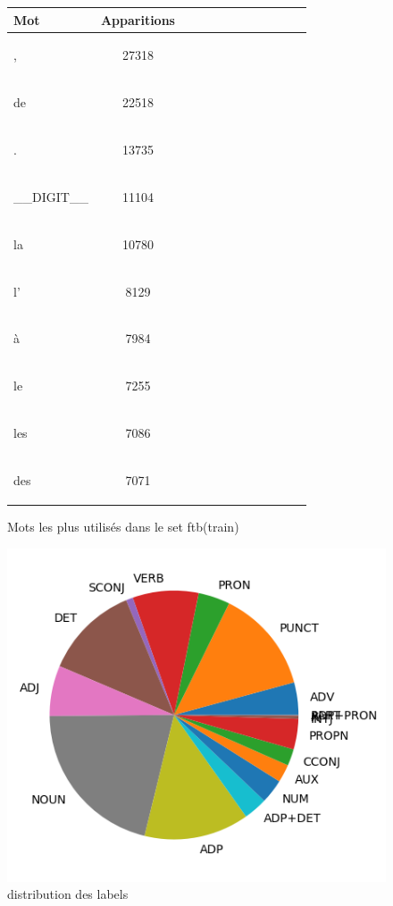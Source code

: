 \begin{figure}[H] \begin{minipage}{0.48\textwidth} \centering \begin{tabular}{|l || *{11 }{|c} |} \hline
Mot & Apparitions  \\ \hline
\begin{verb} , \end{verb} &27318\\ \hline
\begin{verb} de \end{verb} &22518\\ \hline
\begin{verb} . \end{verb} &13735\\ \hline
\begin{verb} __DIGIT__ \end{verb} &11104\\ \hline
\begin{verb} la \end{verb} &10780\\ \hline
\begin{verb} l' \end{verb} &8129\\ \hline
\begin{verb} à \end{verb} &7984\\ \hline
\begin{verb} le \end{verb} &7255\\ \hline
\begin{verb} les \end{verb} &7086\\ \hline
\begin{verb} des \end{verb} &7071\\ \hline

\end{tabular}
\caption{ Mots les plus utilisés dans le set ftb(train) } \label{Fig:muw}\end{minipage} 
\begin{minipage}{0.48\textwidth} \centering
\includegraphics[width=.7\linewidth]{ftbtrain_img.png}
\caption{distribution des labels}
\end{minipage}
\end{figure}


